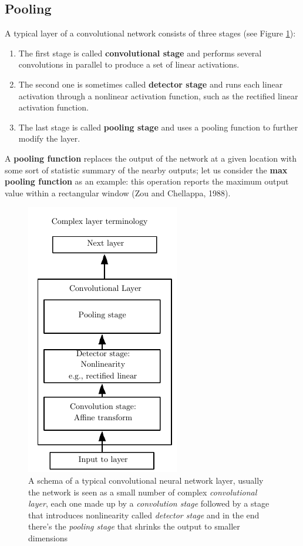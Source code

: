 \documentclass[11pt,a4paper,titlepage]{book}
\begin{document}
\subsection{Pooling}
A typical layer of a convolutional network consists of three stages (see Figure \ref{cnn_schema}):
\begin{enumerate}
    \item The first stage is called \textbf{convolutional stage} and performs several convolutions in parallel to produce a set of linear activations.
    \item The second one is sometimes called \textbf{detector stage} and runs each linear activation through a nonlinear activation function, such as the rectified linear activation function.
    \item The last stage is called \textbf{pooling stage} and uses a pooling function to further modify the layer.
\end{enumerate}
A \textbf{pooling function} replaces the output of the network at a given location with some sort of statistic summary of the nearby outputs; let us consider the \textbf{max pooling function} as an example: this operation reports the maximum output value within a rectangular window (Zou and Chellappa, 1988).
\begin{figure}[ht]
    \includegraphics[scale=0.5]{imgs/ch_1/cnn_schema.png}
    \centering
    \caption{A schema of a typical convolutional neural network layer, usually the network is seen as a small number of complex \textit{convolutional layer}, each one made up by a \textit{convolution stage} followed by a stage that introduces nonlinearity called \textit{detector stage} and in the end there's the \textit{pooling stage} that shrinks the output to smaller dimensions}
    \label{cnn_schema}
\end{figure}
\end{document}
